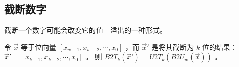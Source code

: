 {    \subsection{截断数字}
    {
        截断一个数字可能会改变它的值---溢出的一种形式。

        \begin{defines}[截断无符号数]
            令 $\vec x$ 等于位向量 $[x_{w - 1}, x_{w - 2}, \cdots, x_0]$ ，而 $\vec x'$ 是将其截断为 $k$ 位的结果： $\vec x' = [x_{k - 1}, x_{k - 2}, \cdots, x_0]$ 。
            则 $B2T_k(\vec x') = U2T_k(B2U_w(\vec x))$ 。
        \end{defines}


    }
}
